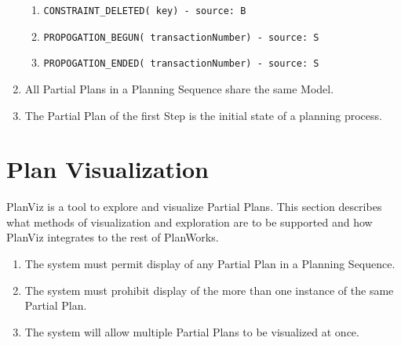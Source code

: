 \documentclass[twoside, 11pt]{article}
\begin{document}
\begin{enumerate}
\begin{enumerate}
\item \begin{verbatim}CONSTRAINT_DELETED( key) - source: B\end{verbatim}
\item \begin{verbatim}PROPOGATION_BEGUN( transactionNumber) - source: S\end{verbatim}
\item \begin{verbatim}PROPOGATION_ENDED( transactionNumber) - source: S\end{verbatim}
\end{enumerate}
\item All Partial Plans in a Planning Sequence share the same Model.
\item The Partial Plan of the first Step is the initial state of a planning process.
\end{enumerate}

\section{Plan Visualization}
PlanViz is a tool to explore and visualize Partial Plans. This section describes what methods of visualization and exploration are to be supported and how PlanViz integrates to the rest of PlanWorks.
\begin{enumerate}
\item The system must permit display of any Partial Plan in a Planning Sequence.
\item The system must prohibit display of the more than one instance of the same Partial Plan.
\item The system will allow multiple Partial Plans to be visualized at once.
\end{enumerate}
\end{document}
